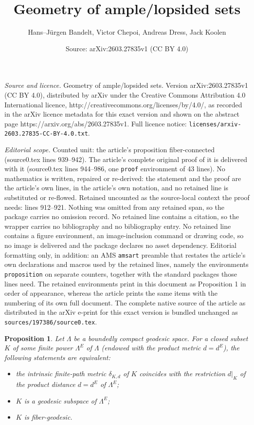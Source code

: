 \documentclass[10pt,a4paper]{amsart}
\title{Geometry of ample/lopsided sets}
\author{Hans--J\"urgen Bandelt, Victor Chepoi, Andreas Dress, Jack Koolen}
\date{Source: arXiv:2603.27835v1 (CC BY 4.0)}
\newtheorem{proposition}{Proposition}
\begin{document}
\maketitle

\noindent\emph{Source and licence.} Geometry of ample/lopsided sets. Version arXiv:2603.27835v1 (CC BY 4.0), distributed by arXiv under the Creative Commons Attribution 4.0 International licence, http://creativecommons.org/licenses/by/4.0/, as recorded in the arXiv licence metadata for this exact version and shown on the abstract page https://arxiv.org/abs/2603.27835v1. Full licence notice: \texttt{licenses/arxiv-2603.27835-CC-BY-4.0.txt}.\par\smallskip

\noindent\textit{Editorial scope.} Counted unit: the article's proposition fiber-connected (source0.tex lines 939--942). The article's complete original proof of it is delivered with it (source0.tex lines 944--986, one \texttt{proof} environment of 43 lines). No mathematics is written, repaired or re-derived: the statement and the proof are the article's own lines, in the article's own notation, and no retained line is substituted or re-flowed.  Retained uncounted as the source-local context the proof needs: lines 912--921.  Nothing was omitted from any retained span, so the package carries no omission record.  No retained line contains a citation, so the wrapper carries no bibliography and no bibliography entry.  No retained line contains a figure environment, an image-inclusion command or drawing code, so no image is delivered and the package declares no asset dependency.  Editorial formatting only, in addition: an AMS \texttt{amsart} preamble that restates the article's own declarations and macros used by the retained lines, namely the environments \texttt{proposition} on separate counters, together with the standard packages those lines need.  The retained environments print in this document as Proposition 1 in order of appearance, whereas the article prints the same items with the numbering of its own full document.  The complete native source of the article as distributed in the arXiv e-print for this exact version is bundled unchanged as \texttt{sources/197386/source0.tex}.
\begin{proposition} \label{fiber-isometric} Let $\Lambda$ be a boundedly compact geodesic space. For a closed subset $K$ of some finite power ${\Lambda}^E$
of $\Lambda$ (endowed with the product metric $d=d^E$), the following statements are equivalent:

\begin{itemize}
\item[\rm(i)] the intrinsic finite-path metric $\delta_{{K},d}$ of $K$ coincides with the restriction $d|_{K}$
of the product distance $d=d^E$ of ${\Lambda}^E$;
\item[\rm(ii)] ${K}$ is a geodesic subspace of ${\Lambda}^E$;
\item[\rm(iii)] ${K}$ is fiber-geodesic.
\end{itemize}
\end{proposition}
\end{document}
